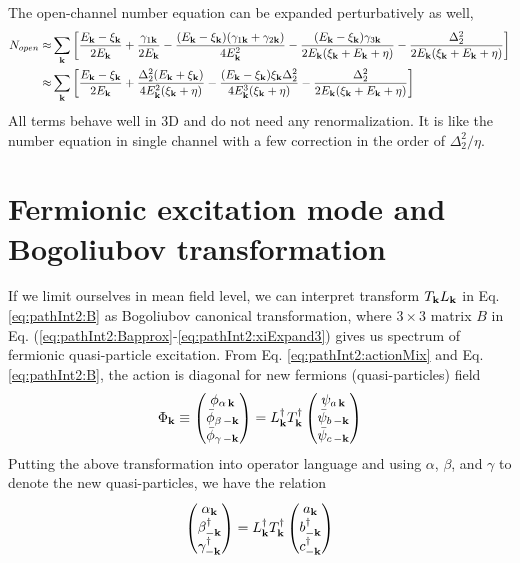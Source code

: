The open-channel number equation  can be expanded perturbatively as well, \begin{equation}
\begin{split}
N_{open}\approx&\sum_{\mathbf{k}}\left[\frac{E_{\mathbf{k}}-\xi_{\mathbf{k}}}{2E_{\mathbf{k}}}+\frac{\gamma_{1\mathbf{k}}}{2E_{\mathbf{k}}}
	-\frac{(E_{\mathbf{k}}-\xi_{\mathbf{k}})(\gamma_{1\mathbf{k}}+\gamma_{2\mathbf{k}})}{4E_{\mathbf{k}}^2}
	-\frac{(E_{\mathbf{k}}-\xi_{\mathbf{k}})\gamma_{3\mathbf{k}}}{2E_{\mathbf{k}}(\xi_{\mathbf{k}}+E_{\mathbf{k}}+\eta)}
	-\frac{\Delta_{2}^{2}}{2E_{\mathbf{k}}(\xi_{\mathbf{k}}+E_{\mathbf{k}}+\eta)}\right]\\
	\approx&\sum_{\mathbf{k}}\left[\frac{E_{\mathbf{k}}-\xi_{\mathbf{k}}}{2E_{\mathbf{k}}}+\frac{{\Delta_{2}^{2}(E_{\mathbf{k}}+\xi_{\mathbf{k}})}}{4E_{\mathbf{k}}^{2}(\xi_{\mathbf{k}}+\eta)}
	-\frac{(E_{\mathbf{k}}-\xi_{\mathbf{k}})\xi_{\mathbf{k}}\Delta_{2}^{2}}{4E_{\mathbf{k}}^3(\xi_{\mathbf{k}}+\eta)}
	-\frac{\Delta_{2}^{2}}{2E_{\mathbf{k}}(\xi_{\mathbf{k}}+E_{\mathbf{k}}+\eta)}\right]	
\end{split}
\end{equation}
All terms behave well  in 3D and do not need any renormalization.   It is like the number equation in single channel with  a few correction in the order of $\Delta_2^2/\eta$.  

%

\section{Fermionic excitation mode and Bogoliubov transformation\label{sec:pathInt2:bog}}
If we limit ourselves in mean field level, we can interpret transform $T_{\mathbf{k}}{}L_{\mathbf{k}}$ in Eq. \eqref{eq:pathInt2:B} as Bogoliubov canonical transformation, where  $3\times3$ matrix $B$ in Eq. (\ref{eq:pathInt2:Bapprox}-\ref{eq:pathInt2:xiExpand3}) gives us spectrum of fermionic quasi-particle excitation. From Eq. \eqref{eq:pathInt2:actionMix} and Eq. \eqref{eq:pathInt2:B}, the action is diagonal for new fermions (quasi-particles) field 
\begin{equation*}
\Phi_{\mathbf{k}}\equiv\begin{pmatrix}\phi_{\alpha\,\mathbf{k}}\\\bar\phi_{\beta\,-\mathbf{k}}\\\bar\phi_{\gamma\,-\mathbf{k}}\end{pmatrix}
=L^{\dagger}_{\mathbf{k}}T^{\dagger}_{\mathbf{k}}\begin{pmatrix}\psi_{a\,\mathbf{k}}\\\bar\psi_{b\,-\mathbf{k}}\\\bar\psi_{c\,-\mathbf{k}}\end{pmatrix}
\end{equation*}
Putting the above transformation into operator language and using $\alpha$, $\beta$, and $\gamma$ to denote the new quasi-particles,  we have the relation
\begin{equation}
\begin{pmatrix}\alpha_{\mathbf{k}}\\\beta_{-\mathbf{k}}^{\dagger}\\\gamma_{-\mathbf{k}}^{\dagger}\end{pmatrix}
=L^{\dagger}_{\mathbf{k}}T^{\dagger}_{\mathbf{k}}  \begin{pmatrix}a_{\mathbf{k}}\\b_{-\mathbf{k}}^{\dagger}\\c_{-\mathbf{k}}^{\dagger}\end{pmatrix}
\end{equation}   

